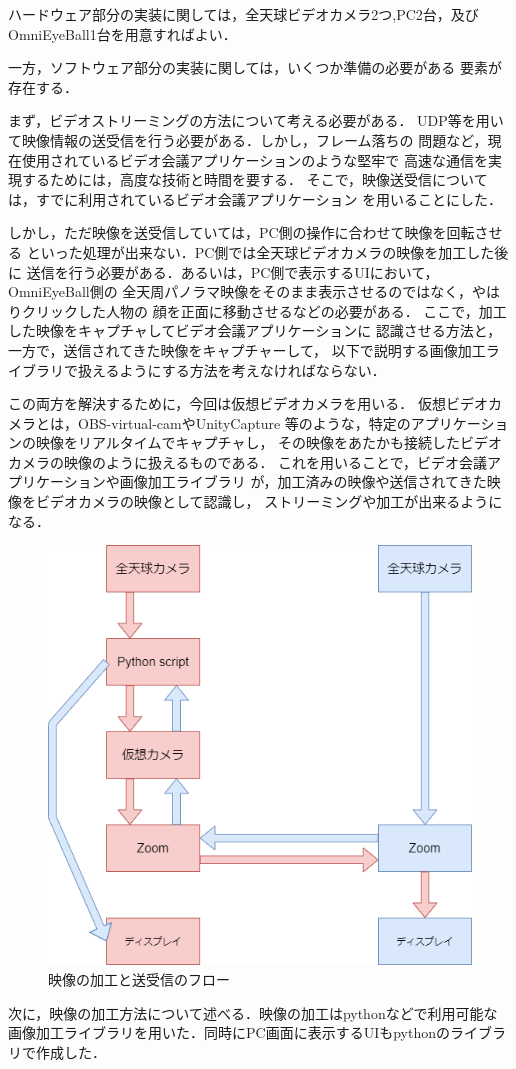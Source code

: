 ハードウェア部分の実装に関しては，全天球ビデオカメラ2つ,PC2台，及び
OmniEyeBall1台を用意すればよい．

一方，ソフトウェア部分の実装に関しては，いくつか準備の必要がある
要素が存在する．

まず，ビデオストリーミングの方法について考える必要がある．
UDP等を用いて映像情報の送受信を行う必要がある．しかし，フレーム落ちの
問題など，現在使用されているビデオ会議アプリケーションのような堅牢で
高速な通信を実現するためには，高度な技術と時間を要する．
そこで，映像送受信については，すでに利用されているビデオ会議アプリケーション
を用いることにした．

しかし，ただ映像を送受信していては，PC側の操作に合わせて映像を回転させる
といった処理が出来ない．PC側では全天球ビデオカメラの映像を加工した後に
送信を行う必要がある．あるいは，PC側で表示するUIにおいて，OmniEyeBall側の
全天周パノラマ映像をそのまま表示させるのではなく，やはりクリックした人物の
顔を正面に移動させるなどの必要がある．
ここで，加工した映像をキャプチャしてビデオ会議アプリケーションに
認識させる方法と，一方で，送信されてきた映像をキャプチャーして，
以下で説明する画像加工ライブラリで扱えるようにする方法を考えなければならない．

この両方を解決するために，今回は仮想ビデオカメラを用いる．
仮想ビデオカメラとは，OBS-virtual-cam\cite{7}やUnityCapture\cite{8}
等のような，特定のアプリケーションの映像をリアルタイムでキャプチャし，
その映像をあたかも接続したビデオカメラの映像のように扱えるものである．
これを用いることで，ビデオ会議アプリケーションや画像加工ライブラリ
が，加工済みの映像や送信されてきた映像をビデオカメラの映像として認識し，
ストリーミングや加工が出来るようになる．

\begin{figure}[tbp]
  \centering
  \includegraphics[scale=0.7]{fig/flow.png}
  \caption{映像の加工と送受信のフロー}
\end{figure}

次に，映像の加工方法について述べる．映像の加工はpythonなどで利用可能な
画像加工ライブラリを用いた．同時にPC画面に表示するUIもpythonのライブラリで作成した．


